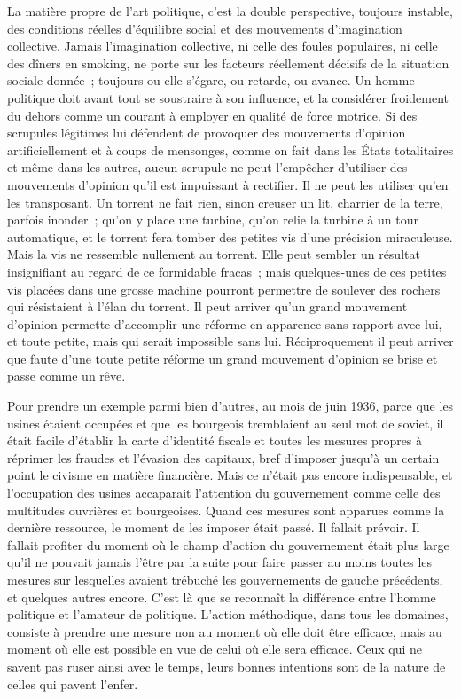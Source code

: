 \documentclass[french,twoside]{book} %
\begin{document}
La matière propre de l'art politique, c'est la double perspective, toujours instable, des conditions réelles d'équilibre social et des mouvements d'imagi­nation collective. Jamais l'imagination collective, ni celle des foules populai­res, ni celle des dîners en smoking, ne porte sur les facteurs réellement décisifs de la situation sociale donnée ; toujours ou elle s'égare, ou retarde, ou avance. Un homme politique doit avant tout se soustraire à son influence, et la considérer froidement du dehors comme un courant à employer en qualité de force motrice. Si des scrupules légitimes lui défendent de provoquer des mouvements d'opinion artificiellement et à coups de mensonges, comme on fait dans les États totalitaires et même dans les autres, aucun scrupule ne peut l'empêcher d'utiliser des mouvements d'opinion qu'il est impuissant à rectifier. Il ne peut les utiliser qu'en les transposant. Un torrent ne fait rien, sinon creuser un lit, charrier de la terre, parfois inonder ; qu'on y place une turbine, qu'on relie la turbine à un tour automatique, et le torrent fera tomber des petites vis d'une précision miraculeuse. Mais la vis ne ressemble nullement au torrent. Elle peut sembler un résultat insignifiant au regard de ce formidable fracas ; mais quelques-unes de ces petites vis placées dans une grosse machine pourront permettre de soulever des rochers qui résistaient à l'élan du torrent. Il peut arriver qu'un grand mouvement d'opinion permette d'accomplir une réforme en apparence sans rapport avec lui, et toute petite, mais qui serait impossible sans lui. Réciproquement il peut arriver que faute d'une toute petite réforme un grand mouvement d'opinion se brise et passe comme un rêve.\par
Pour prendre un exemple parmi bien d'autres, au mois de juin 1936, parce que les usines étaient occupées et que les bourgeois tremblaient au seul mot de soviet, il était facile d'établir la carte d'identité fiscale et toutes les mesures propres à réprimer les fraudes et l'évasion des capitaux, bref d'imposer jusqu'à un certain point le civisme en matière financière. Mais ce n'était pas encore indispensable, et l'occupation des usines accaparait l'attention du gouverne­ment comme celle des multitudes ouvrières et bourgeoises. Quand ces mesures sont apparues comme la dernière ressource, le moment de les imposer était passé. Il fallait prévoir. Il fallait profiter du moment où le champ d'action du gouvernement était plus large qu'il ne pouvait jamais l'être par la suite pour faire passer au moins toutes les mesures sur lesquelles avaient trébuché les gouvernements de gauche précédents, et quelques autres encore. C'est là que se reconnaît la différence entre l'homme politique et l'amateur de politique. L'action méthodique, dans tous les domaines, consiste à prendre une mesure non au moment où elle doit être efficace, mais au moment où elle est possible en vue de celui où elle sera efficace. Ceux qui ne savent pas ruser ainsi avec le temps, leurs bonnes intentions sont de la nature de celles qui pavent l'enfer.\par
\end{document}
